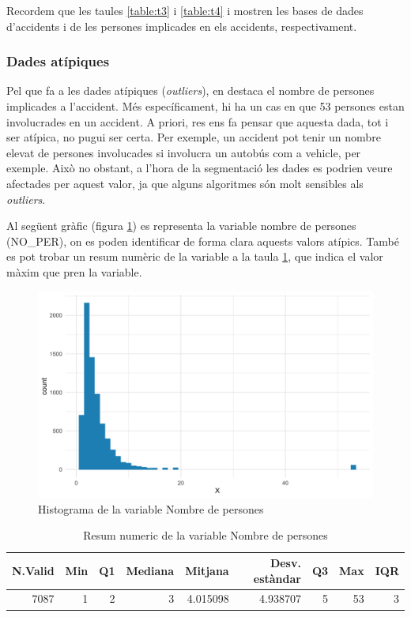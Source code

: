 \documentclass[12pt,longbibliography]{article}
\theoremstyle{definition}
\theoremstyle{remark}
\begin{document}
Recordem que les taules \ref{table:t3} i \ref{table:t4} i mostren les bases de dades d'accidents i de les persones implicades en els accidents, respectivament.

\subsubsection{Dades atípiques}

Pel que fa a les dades atípiques (\textit{outliers}), en destaca el nombre de persones implicades a l'accident. Més específicament, hi ha un cas en que 53 persones estan involucrades en un accident. A priori, res ens fa pensar que aquesta dada, tot i ser atípica, no pugui ser certa. Per exemple, un accident pot tenir un nombre elevat de persones involucades si involucra un autobús com a vehicle, per exemple. Això no obstant, a l'hora de la segmentació les dades es podrien veure afectades per aquest valor, ja que alguns algoritmes són molt sensibles als \textit{outliers}.

Al següent gràfic (figura \ref{fig:F1}) es representa la variable nombre de persones (NO\_PER), on es poden identificar de forma clara aquests valors atípics. També es pot trobar un resum numèric de la variable a la taula \ref{table:Fig1a}, que indica el valor màxim que pren la variable.


\begin{figure}[H]
\begin{center}
\includegraphics[width=12.5cm]{Figura1}
\end{center}
\caption{Histograma de la variable Nombre de persones}
\label{fig:F1}
\end{figure}

\begin{table}[H]
\centering
\begin{tabular}{|r|r|r|r|r|r|r|r|r|}
\hline
N.Valid & Min & Q1 & Mediana & Mitjana  & Desv. estàndar & Q3 & Max & IQR \\ \hline
7087    & 1   & 2  & 3       & 4.015098 & 4.938707       & 5  & 53  & 3   \\ \hline
\end{tabular}
\caption{Resum numeric de la variable Nombre de persones \label{table:Fig1a}}
\end{table}
\end{document}
